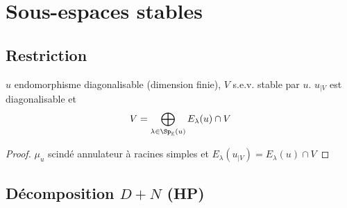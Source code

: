 \section{Sous-espaces stables}

\subsection{Restriction}

\begin{prop}
    \Hyp $u$ endomorphisme diagonalisable (dimension finie), $V$ s.e.v. stable par $u$.
    \Conc $u_{|V}$ est diagonalisable et \[
        V=\bigoplus_{\lambda\in\Sp_{\mathbb K}(u)}E_\lambda(u)\cap V
    \]
\end{prop}

\begin{proof}
    $\mu_u$ scindé annulateur à racines simples et $E_\lambda(u_{|V})=E_\lambda(u)\cap V$
\end{proof}

\subsection{Décomposition $D+N$ (HP)}

